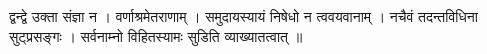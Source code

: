 द्वन्द्वे उक्ता संज्ञा न । वर्णाश्रमेतराणाम् । समुदायस्यायं निषेधो न
त्ववयवानाम् । नचैवं तदन्तविधिना सुट्प्रसङ्गः । सर्वनाम्नो विहितस्यामः
सुडिति व्याख्यातत्वात् ॥
